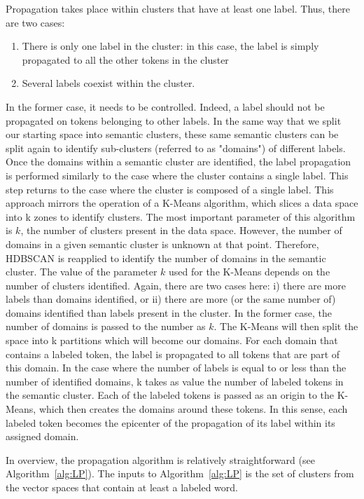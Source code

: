 Propagation takes place within clusters that have at least one label.
Thus, there are two cases:
\begin{enumerate}
    \item There is only one label in the cluster: in this case, the label is simply propagated to all the other tokens in the cluster
    \item Several labels coexist within the cluster.
\end{enumerate}

In the former case, it needs to be controlled.
Indeed, a label should not be propagated on tokens belonging to other labels.
In the same way that we split our starting space into semantic clusters, these same semantic clusters can be split again to identify sub-clusters (referred to as "domains") of different labels.
Once the domains within a semantic cluster are identified, the label propagation is performed similarly to the case where the cluster contains a single label.
This step returns to the case where the cluster is composed of a single label.
This approach mirrors the operation of a K-Means algorithm, which slices a data space into k zones to identify clusters.
The most important parameter of this algorithm is \(k\), the number of clusters present in the data space.
However, the number of domains in a given semantic cluster is unknown at that point.
Therefore, HDBSCAN is reapplied to identify the number of domains in the semantic cluster.
The value of the parameter \(k\) used for the K-Means depends on the number of clusters identified.
Again, there are two cases here: i) there are more labels than domains identified, or ii) there are more (or the same number of) domains identified than labels present in the cluster.
In the former case, the number of domains is passed to the number as \(k\).
The K-Means will then split the space into k partitions which will become our domains.
For each domain that contains a labeled token, the label is propagated to all tokens that are part of this domain.
In the case where the number of labels is equal to or less than the number of identified domains, k takes as value the number of labeled tokens in the semantic cluster.
Each of the labeled tokens is passed as an origin to the K-Means, which then creates the domains around these tokens.
In this sense, each labeled token becomes the epicenter of the propagation of its label within its assigned domain.

In overview, the propagation algorithm is relatively straightforward (see Algorithm~\ref{alg:LP}).
The inputs to Algorithm~\ref{alg:LP} is the set of clusters from the vector spaces that contain at least a labeled word.

